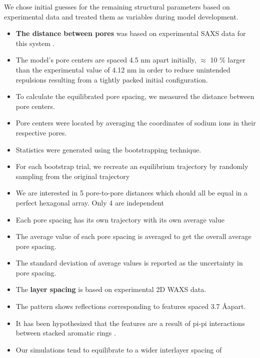 \documentclass{article}
\newcommand{\angstrom}{\textup{\AA}}
\begin{document}
  We chose initial guesses for the remaining structural parameters based on 
  experimental data and treated them as variables during model development.
  \begin{itemize}
    \item \textbf{The distance between pores} was based on experimental SAXS data for
    this system \cite{feng_thin_2016}.
    \item The model's pore centers are spaced 4.5 nm apart initially, $\approx$ 10 \% larger
    than the experimental value of 4.12 nm in order to reduce unintended repulsions 
    resulting from a tightly packed initial configuration.
    \item To calculate the equilibrated pore spacing, we measured the distance between pore
    centers.
    \item Pore centers were located by averaging the coordinates of sodium ions in their 
    respective pores.
    \item Statistics were generated using the bootstrapping technique.
    \item For each bootstrap trial, we recreate an equilibrium trajectory by randomly 
    sampling from the original trajectory
    \item We are interested in 5 pore-to-pore distances which should all be equal in 
    a perfect hexagonal array. Only 4 are independent  %
    \item Each pore spacing has its own trajectory with its own average value
    \item The average value of each pore spacing is averaged to get the overall
    average pore spacing. 
    \item The standard deviation of average values is reported as the uncertainty in pore spacing.
    \item The \textbf{layer spacing} is based on experimental 2D WAXS data.
    \item The pattern shows reflections corresponding to features spaced 3.7 \angstrom apart.
    \item It has been hypothesized that the features are a result of pi-pi
    interactions between stacked aromatic rings \cite{feng_scalable_2014}. 
    \item Our simulations tend to equilibrate to a wider interlayer spacing of

\end{itemize}
\end{document}
